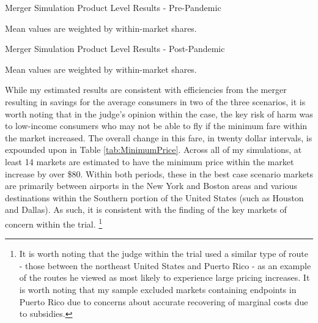 \documentclass{article}
\begin{document}
    \begin{table}
        \caption{Merger Simulation Product Level Results - Pre-Pandemic}
        \label{tab:Simulation_Pre}      
        \vspace{-15mm}
        \begin{center} 
        \end{center}
        Mean values are weighted by within-market shares. 
    \end{table}

    \begin{table}
        \caption{Merger Simulation Product Level Results - Post-Pandemic}
        \label{tab:Simulation_Post}
                \vspace{-15mm}
        \begin{center}
         
        \end{center}
        Mean values are weighted by within-market shares. 
     \end{table}

    While my estimated results are consistent with efficiencies from the merger resulting in savings for the average consumers in two of the three scenarios, it is worth noting that in the judge's opinion within the case, the key risk of harm was to low-income consumers who may not be able to fly if the minimum fare within the market increased. The overall change in this fare, in twenty dollar intervals, is expounded upon in Table \ref{tab:MinimumPrice}. Across all of my simulations, at least 14 markets are estimated to have the minimum price within the market increase by over \$80. Within both periods, these in the best case scenario markets are primarily between airports in the New York and Boston areas and various destinations within the Southern portion of the United States (such as Houston and Dallas). As such, it is consistent with the finding of the key markets of concern within the trial. \footnote{It is worth noting that the judge within the trial used a similar type of route - those between the northeast United States and Puerto Rico - as an example of the routes he viewed as most likely to experience large pricing increases. It is worth noting that my sample excluded markets containing endpoints in Puerto Rico due to concerns about accurate recovering of marginal costs due to subsidies.} 
\end{document}

